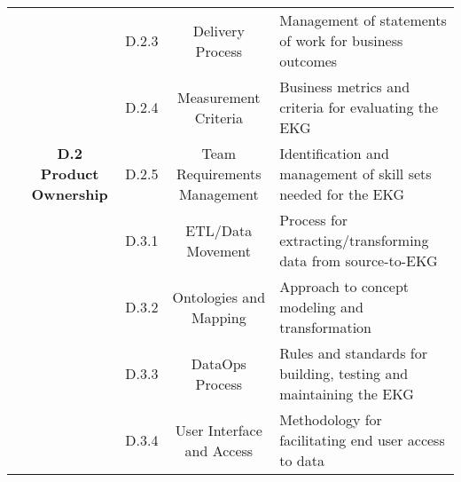 \begin{table}[ht]
\begin{tabular}{@{}cclcl@{}}
    \cellcolor[HTML]{A5A5A5}{}                                            & \cellcolor[HTML]{BFBFBF}                                                           & \cellcolor[HTML]{D8D8D8}D.2.3 & \cellcolor[HTML]{D8D8D8}Delivery Process             & \cellcolor[HTML]{F2F2F2}Management of statements of work for business outcomes                 \\
    \cellcolor[HTML]{A5A5A5}{}                                            & \cellcolor[HTML]{BFBFBF}                                                           & \cellcolor[HTML]{D8D8D8}D.2.4 & \cellcolor[HTML]{D8D8D8}Measurement Criteria         & \cellcolor[HTML]{F2F2F2}Business metrics and criteria for evaluating the EKG                   \\
    \cellcolor[HTML]{A5A5A5}{}                                            & \multirow{-5}{*}{\cellcolor[HTML]{BFBFBF}\textbf{D.2 Product Ownership}}           & \cellcolor[HTML]{D8D8D8}D.2.5 & \cellcolor[HTML]{D8D8D8}Team Requirements Management & \cellcolor[HTML]{F2F2F2}Identification and management of skill sets needed for the EKG         \\
    \cellcolor[HTML]{A5A5A5}{}                                            & \cellcolor[HTML]{BFBFBF}                                                           & \cellcolor[HTML]{D8D8D8}D.3.1 & \cellcolor[HTML]{D8D8D8}ETL/Data Movement            & \cellcolor[HTML]{F2F2F2}Process for extracting/transforming data from source-to-EKG            \\
    \cellcolor[HTML]{A5A5A5}{}                                            & \cellcolor[HTML]{BFBFBF}                                                           & \cellcolor[HTML]{D8D8D8}D.3.2 & \cellcolor[HTML]{D8D8D8}Ontologies and Mapping       & \cellcolor[HTML]{F2F2F2}Approach to concept modeling and transformation                        \\
    \cellcolor[HTML]{A5A5A5}{}                                            & \cellcolor[HTML]{BFBFBF}                                                           & \cellcolor[HTML]{D8D8D8}D.3.3 & \cellcolor[HTML]{D8D8D8}DataOps Process              & \cellcolor[HTML]{F2F2F2}Rules and standards for building, testing and maintaining the EKG      \\
    \cellcolor[HTML]{A5A5A5}{}                                            & \cellcolor[HTML]{BFBFBF}                                                           & \cellcolor[HTML]{D8D8D8}D.3.4 & \cellcolor[HTML]{D8D8D8}User Interface and Access    & \cellcolor[HTML]{F2F2F2}Methodology for facilitating end user access to data                   \\

\end{tabular}
\end{table}
